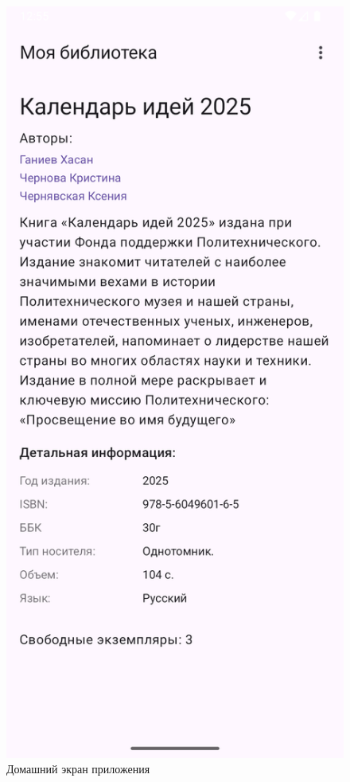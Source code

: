 \begin{figure}[H]
	\includegraphics[scale=0.2]{img/book_detail.png}
	\caption{Домашний экран приложения}
	\label{fig:home}
\end{figure}

